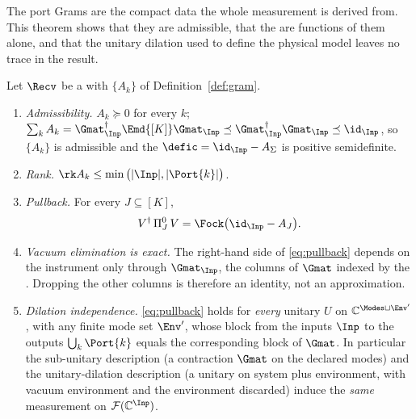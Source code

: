 
The port Grams are the compact data the whole measurement is derived from.
This theorem shows that they are admissible, that the  are functions of them alone, and that the unitary dilation used to
define the physical model leaves no trace in the result.

\begin{theorem}\label{thm:port-grams}
Let $\Recv$ be a  with
 $\{A_k\}$ of
Definition~\ref{def:gram}.
\begin{enumerate}[label=(\roman*),leftmargin=3.0em]
\item \emph{Admissibility.} $A_k\succeq0$ for every $k$;
  $\sum_{k}A_k=\Gmat_{\Inp}^\dagger\Emd{[K]}\Gmat_{\Inp}\preceq
  \Gmat_{\Inp}^\dagger\Gmat_{\Inp}\preceq\id_{\Inp}$, so
  $\{A_k\}$ is admissible and the 
  $\defic=\id_{\Inp}-A_\Sigma$ is positive semidefinite.
\item \emph{Rank.} $\rk A_k\le\min\big(|\Inp|,|\Port{k}|\big)$.
\item \emph{Pullback.} For every $J\subseteq[K]$,
  \begin{equation}\label{eq:pullback}
    V^\dagger\,\Pi^0_J\,V=\Fock\big(\id_{\Inp}-A_J\big).
  \end{equation}
\item \emph{Vacuum elimination is exact.} The right-hand side of
  \eqref{eq:pullback} depends on the instrument only through
  $\Gmat_{\Inp}$, the columns of $\Gmat$ indexed by the
  . Dropping the other columns is therefore an identity, not an
  approximation.
\item \emph{Dilation independence.} \eqref{eq:pullback} holds for
  \emph{every} unitary $U$ on $\mathbb{C}^{\Modes\sqcup\Env'}$, with any
  finite mode set $\Env'$, whose block from the inputs $\Inp$ to the outputs
  $\bigcup_k\Port{k}$ equals the corresponding block of $\Gmat$. In particular
  the sub-unitary description (a contraction $\Gmat$ on the declared modes) and
  the unitary-dilation description (a unitary on system plus environment, with
  vacuum environment and the environment discarded) induce the \emph{same}
  measurement on $\mathcal{F}(\mathbb{C}^{\Inp})$.
\end{enumerate}
\end{theorem}

